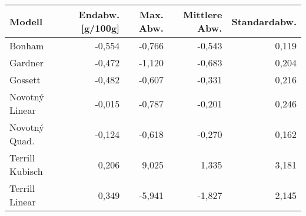 \begin{tabular}{lrrrr}
\toprule
         Modell &  Endabw. [g/100g] &  Max. Abw. &  Mittlere Abw. &  Standardabw. \\
\midrule
         Bonham &            -0,554 &     -0,766 &         -0,543 &         0,119 \\
        Gardner &            -0,472 &     -1,120 &         -0,683 &         0,204 \\
        Gossett &            -0,482 &     -0,607 &         -0,331 &         0,216 \\
 Novotný Linear &            -0,015 &     -0,787 &         -0,201 &         0,246 \\
  Novotný Quad. &            -0,124 &     -0,618 &         -0,270 &         0,162 \\
Terrill Kubisch &             0,206 &      9,025 &          1,335 &         3,181 \\
 Terrill Linear &             0,349 &     -5,941 &         -1,827 &         2,145 \\
\bottomrule
\end{tabular}
